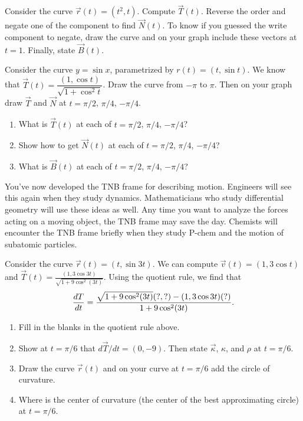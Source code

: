 \begin{problem}
Consider the curve $\vec r(t)=(t^2,t)$. Compute $\vec T(t)$. Reverse the order and negate one of the component to find $\vec N(t)$. To know if you guessed the write component to negate, draw the curve and on your graph include these vectors at $t=1$. Finally, state $\vec B(t)$.
\end{problem}

\begin{problem}
%
 Consider the curve $y=\sin x$, parametrized by $r(t)=(t,\sin t)$. We know that $\vec T(t) = \dfrac{(1,\cos t)}{\sqrt{1+\cos^2t}}$. Draw the curve from $-\pi$ to $\pi$. Then on your graph draw $\vec T$ and $\vec N$ at $t=\pi/2$, $\pi/4$, $-\pi/4$.  
\begin{enumerate}
 \item What is  $\vec T(t)$ at each of $t=\pi/2$, $\pi/4$, $-\pi/4$?
 \item Show how to get $\vec N(t)$ at each of $t=\pi/2$, $\pi/4$, $-\pi/4$?
 \item What is  $\vec B(t)$ at each of $t=\pi/2$, $\pi/4$, $-\pi/4$? 
\end{enumerate}
\end{problem}


You've now developed the TNB frame for describing motion. Engineers will see this again when they study dynamics. Mathematicians who study differential geometry will use these ideas as well. Any time you want to analyze the forces acting on a moving object, the TNB frame may save the day. Chemists will encounter the TNB frame briefly when they study P-chem and the motion of subatomic particles.



\begin{problem}
 Consider the curve $\vec r(t)=(t,\sin 3 t)$. We can compute 
$\vec v(t) = (1,3\cos t)$  and 
$\vec T(t) = \frac{(1,3\cos 3t)}{\sqrt{1+9\cos^2(3t)}}$.
Using the quotient rule, we find that 
$$\displaystyle\frac{dT}{dt} = \frac{\sqrt{1+9\cos^2(3t)}(?,?) - (1,3\cos3t)(?)}{1+9\cos^2(3t)}.$$
\begin{enumerate}
 \item Fill in the blanks in the quotient rule above. 
 \item{}%
 Show at $t=\pi/6$ that $d\vec T/dt = (0,-9)$. Then state $\vec \kappa$, $\kappa$, and $\rho$ at $t=\pi/6$. 
 \item Draw the curve $\vec r(t)$ and on your curve at $t=\pi/6$ add the circle of curvature.
 \item Where is the center of curvature (the center of the best approximating circle) at $t=\pi/6$.
\end{enumerate}

\end{problem}

